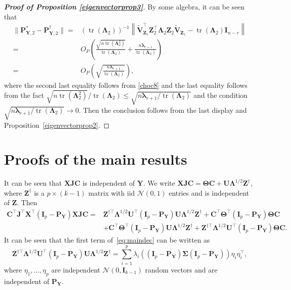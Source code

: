 \documentclass[12pt]{article} %
\DeclareMathOperator{\mytr}{tr}
\newcommand{\bZ}{\mathbf{Z}}
\newcommand{\bX}{\mathbf{X}}
\newcommand{\bP}{\mathbf{P}}
\newcommand{\bY}{\mathbf{Y}}
\newcommand{\bJ}{\mathbf{J}}
\newcommand{\bC}{\mathbf{C}}
\newcommand{\bI}{\mathbf{I}}
\newcommand{\bU}{\mathbf{U}}
\newcommand{\bV}{\mathbf{V}}
\newcommand{\bfsym}[1]{\ensuremath{\boldsymbol{#1}}}
\def\blambda {\bfsym {\lambda}}
\def\bLambda {\bfsym {\Lambda}}
\def\bSigma {\bfsym {\Sigma}}
\def\bTheta {\bfsym {\Theta}}
\theoremstyle{definition}
\begin{document}
\begin{appendices}
\begin{proof}[\textbf{Proof of Proposition \ref{eigenvectorprop3}}]
    By some algebra,
    it can be seen that
    \begin{equation*}
        \begin{split}
            \Big\|
            \bP_{\bY,2}^{*}
            -
            \bP_{\bY,2}^{\dagger}
            \Big\|
            =&
            \left(\mytr(\bLambda_2)\right)^{-1}
            \left\|
            \tilde{\bV}_{\bZ_1}^\top \bZ_2^\top \bLambda_2 \bZ_2 \tilde{\bV}_{\bZ_1}
            -
            \mytr(\bLambda_2)
            \bI_{n-r}
            \right\|
            \\
            =&
            O_P\left(\frac{\sqrt{n\mytr(\bLambda_2^2)}}{\mytr(\bLambda_2)}+\frac{n\blambda_{r+1}}{\mytr(\bLambda_2)}\right)
            \\
            =&
            O_P\left(\sqrt{\frac{n\blambda_{r+1}}{\mytr(\bLambda_2)}}\right)
            ,
        \end{split}
    \end{equation*}
    where the second last equality follows from \eqref{choc8} and the last equality follows from the fact ${\sqrt{n\mytr(\bLambda_2^2)}}/{\mytr(\bLambda_2)}\leq{\sqrt{n\blambda_{r+1}/\mytr(\bLambda_2)}}$ and the condition ${\sqrt{n\blambda_{r+1}/\mytr(\bLambda_2)}}\to 0$.
    Then the conclusion follows from the last display and Proposition~\ref{eigenvectorprop2}.
     
\end{proof}




\section{Proofs of the main results}\label{app2}
It can be seen that $\bX\bJ\bC$ is independent of $\bY$.
We write
$
\bX\bJ\bC = \bTheta \bC + \bU\bLambda^{1/2} \bZ^{\dagger}
$, 
where $\bZ^{\dagger}$ is a $p\times (k-1)$ matrix with iid $\mathcal{N}(0,1)$ entries and is independent of $\bZ$.
Then 
\begin{equation}\label{eq:maindec}
\begin{aligned}
\bC^\top\bJ^\top \bX^\top(\bI_p-\bP_{\bY}) \bX\bJ\bC
=&
\bZ^{\dagger \top} \bLambda^{1/2}\bU^\top (\bI_p-\bP_{\bY})\bU\bLambda^{1/2}\bZ^{\dagger}+
 \bC^\top \bTheta^\top (\bI_p -\bP_{\bY})\bTheta \bC\\
 &+ \bC^\top \bTheta^\top (\bI_p -\bP_{\bY})\bU\bLambda^{1/2}\bZ^{\dagger}+
 \bZ^{\dagger \top} \bLambda^{1/2}\bU^\top (\bI_p-\bP_{\bY})\bTheta \bC.
\end{aligned}
\end{equation}
    It can be seen that the first term of~\eqref{eq:maindec} can be written as
\begin{equation*}
    \bZ^{\dagger \top} \bLambda^{1/2}\bU^\top (\bI_p-\bP_{\bY})\bU\bLambda^{1/2}\bZ^{\dagger}=
\sum_{i=1}^p \lambda_i ( (\bI_p-\bP_{\bY})\bSigma (\bI_p-\bP_{\bY}))\eta_i \eta_i^\top,
\end{equation*}
where $\eta_1,\ldots, \eta_p$ are independent $\mathcal{N}(0,\bI_{k-1})$ random vectors and are independent of $\bP_{\bY}$.


\end{appendices}
\end{document}
